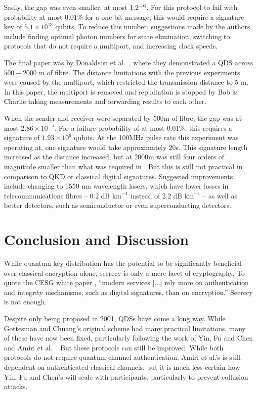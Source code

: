 \documentclass[%
 reprint,
 amsmath,amssymb,
 aps,
 pra,
]{revtex4-1}
\begin{document}
Sadly, the gap was even smaller, at most $1.2 \time 10^{-6}$. For this protocol to fail with probability at most $0.01\%$ for a one-bit message, this would require a signature key of $5.1 \times 10^{13}$ qubits. To reduce this number, suggestions made by the authors include finding optimal photon numbers for state elimination, switching to protocols that do not require a multiport, and increasing clock speeds.

The final paper was by Donaldson et al.\ \cite{PhysRevA.93.012329}, where they demonstrated a QDS across $500-2000\text{ m}$ of fibre. The distance limitations with the previous experiments were caused by the multiport, which restricted the transmission distance to $5\text{ m}$. In this paper, the multiport is removed and repudiation is stopped by Bob \& Charlie taking measurements and forwarding results to each other.

When the sender and receiver were separated by 500m of fibre, the gap was at most $2.86 \times 10^{-4}$. For a failure probability of at most 0.01\%, this requires a signature of $1.93 \times 10^{9}$ qubits. At the 100MHz pulse rate this experiment was operating at, one signature would take approximately 20s. This signature length increased as the distance increased, but at 2000m was still four orders of magnitude smaller than what was required in \cite{PhysRevLett.113.040502}. But this is still not practical in comparison to QKD or classical digital signatures. Suggested improvements include changing to 1550 nm wavelength lasers, which have lower losses in telecommunications fibres -- $0.2\text{ dB km}^{-1}$ instead of $2.2\text{ dB km}^{-1}$ -- as well as better detectors, such as semiconductor \cite{0957-0233-21-1-012002} or even superconducting \cite{0953-2048-25-6-063001} detectors.

\section{Conclusion and Discussion}
\label{sec:conclusion}

While quantum key distribution has the potential to be significantly beneficial over classical encryption alone, secrecy is only a mere facet of cryptography. To quote the CESG white paper \cite{CESG16}, ``modern services [...] rely more on authentication and integrity mechanisms, such as digital signatures, than on encryption.'' Secrecy is not enough.

Despite only being proposed in 2001, QDSs have come a long way. While Gottesman and Chuang's original scheme \cite{quant-ph/0105032} had many practical limitations, many of these have now been fixed, particularly following the work of Yin, Fu and Chen \cite{PhysRevA.93.032316} and Amiri et al.\ \cite{PhysRevA.93.032325}. But these protocols can still be improved. While both protocols do not require quantum channel authentication, Amiri et al.'s is still dependent on authenticated classical channels, but it is much less certain how Yin, Fu and Chen's will scale with participants, particularly to prevent collusion attacks.
\end{document}
